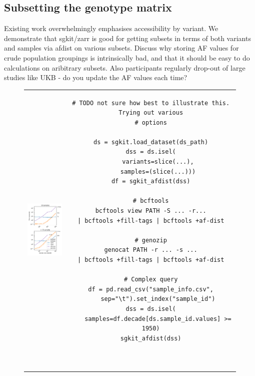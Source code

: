 \documentclass[a4paper,num-refs]{oup-contemporary}
\begin{document}
\subsection{Subsetting the genotype matrix}
Existing work overwhelmingly emphasises accessibility by variant.
We demonstrate that sgkit/zarr is good for getting subsets
in terms of both variants and samples via afdist on various subsets.
Discuss why storing AF values for crude population groupings is
intrinsically bad, and that it should be easy to do calculations
on aribitrary subsets. Also participants regularly drop-out of
large studies like UKB - do you update the AF values each time?

\begin{figure}
\begin{tabular}{cc}
\includegraphics[width=6cm]{figures/subset-matrix-compute} &
\begin{tcolorbox}[width=7cm]
\begin{verbatim}
# TODO not sure how best to illustrate this. Trying out various
# options

ds = sgkit.load_dataset(ds_path)
dss = ds.isel(
    variants=slice(...),
    samples=(slice(...)))
df = sgkit_afdist(dss)

# bcftools
bcftools view PATH -S ... -r...
| bcftools +fill-tags | bcftools +af-dist

# genozip
genocat PATH -r ... -s ...
| bcftools +fill-tags | bcftools +af-dist

# Complex query
df = pd.read_csv("sample_info.csv",
    sep="\t").set_index("sample_id")
dss = ds.isel(
    samples=df.decade[ds.sample_id.values] >= 1950)
sgkit_afdist(dss)



\end{verbatim}
\end{tcolorbox}
\end{tabular}
\end{figure}
\end{document}
